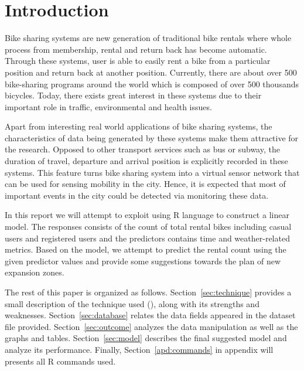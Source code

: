 \section{Introduction}
\label{sec:intro} 
Bike sharing systems are new generation of traditional bike rentals where whole process from membership, rental and return
back has become automatic. Through these systems, user is able to easily rent a bike from a particular position and return
back at another position. Currently, there are about over 500 bike-sharing programs around the world which is composed of
over 500 thousands bicycles. Today, there exists great interest in these systems due to their important role in traffic,
environmental and health issues.

Apart from interesting real world applications of bike sharing systems, the characteristics of data being generated by
these systems make them attractive for the research. Opposed to other transport services such as bus or subway, the duration
of travel, departure and arrival position is explicitly recorded in these systems. This feature turns bike sharing system into
a virtual sensor network that can be used for sensing mobility in the city. Hence, it is expected that most of important
events in the city could be detected via monitoring these data.

In this report we will attempt to exploit {\mlr} using R language to construct a linear model. The responses consists of the count of total rental bikes including casual users and registered users and the predictors contains time and weather-related metrics. Based on the model, we attempt to predict the rental count using the given predictor values and provide some suggestions towards the plan of new expansion zones.

The rest of this paper is organized as follows. Section~\ref{sec:technique} provides a small description of the technique used (\mlr), along with its strengths and weaknesses.
Section~\ref{sec:database} relates the data fields appeared in the dataset file provided. Section~\ref{sec:outcome} analyzes the data manipulation as well as the graphs and tables. Section~\ref{sec:model} describes the final suggested model and analyze its performance. Finally, Section~\ref{apd:commands} in appendix will presents all R commands used.